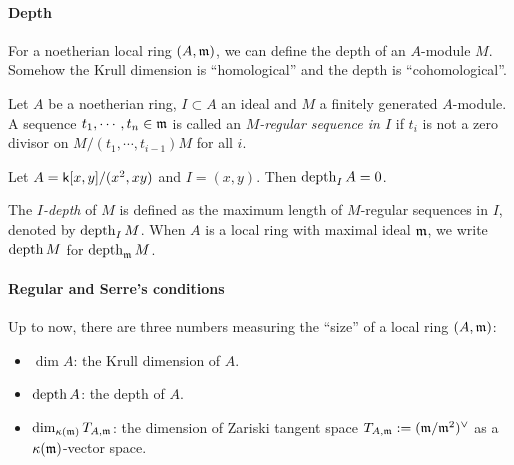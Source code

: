     \paragraph{Depth}
    For a noetherian local ring $(A,{\mathfrak{m}})$, we can define the depth of an $A$-module $M$.
    Somehow the Krull dimension is ``homological'' and the depth is ``cohomological''.

    \begin{definition}\label{def: regular sequence}
        Let $A$ be a noetherian ring, $I \subset A$ an ideal and $M$ a finitely generated $A$-module.
        A sequence $t_1,\cdots,t_n\in {\mathfrak{m}}$ is called an \textit{$M$-regular sequence in $I$} if $t_i$ is not a zero divisor on $M/(t_1,\cdots,t_{i-1})M$ for all $i$. 
    \end{definition}

    \begin{example}
        Let $A = {\mathsf{k}}[x,y]/(x^2,xy)$ and $I = (x,y)$.
        Then $\operatorname{depth}_I A = 0$.
    \end{example}



    \begin{definition}
        The \textit{$I$-depth} of $M$ is defined as the maximum length of $M$-regular sequences in $I$, denoted by $\operatorname{depth}_I M$. 
        When $A$ is a local ring with maximal ideal ${\mathfrak{m}}$, we write $\operatorname{depth} M$ for $\operatorname{depth}_{{\mathfrak{m}}} M$.
    \end{definition}

    \paragraph{Regular and Serre's conditions}
    Up to now, there are three numbers measuring the ``size'' of a local ring $(A,{\mathfrak{m}})$:
    \begin{itemize}
        \item $\dim A$: the Krull dimension of $A$.
        \item $\operatorname{depth} A$: the depth of $A$.
        \item $\dim_{{\kappa}({\mathfrak{m}})} T_{A,{\mathfrak{m}}}$: the dimension of Zariski tangent space $T_{A,{\mathfrak{m}}} := ({\mathfrak{m}}/{\mathfrak{m}}^2)^\lor$ as a ${{\kappa}({\mathfrak{m}})}$-vector space.
    \end{itemize}

